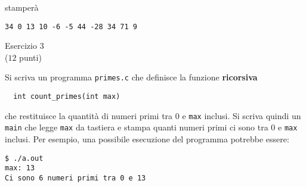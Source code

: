 \documentclass[italian,12pt]{article}
\begin{document}
\noindent
stamper\`a
%
{\small
\begin{verbatim}
34 0 13 10 -6 -5 44 -28 34 71 9
\end{verbatim}
}
%
\begin{center}{\Large Esercizio 3}\\
($12$ punti)\end{center}
%
Si scriva un programma \texttt{primes.c} che definisce la funzione \textbf{ricorsiva}
\begin{verbatim}
  int count_primes(int max)
\end{verbatim}
%
che restituisce la quantit\`a di numeri primi tra 0 e \texttt{max} inclusi.
Si scriva quindi un \texttt{main} che legge \texttt{max} da tastiera
e stampa quanti numeri primi ci sono tra 0 e \texttt{max} inclusi.
Per esempio, una possibile esecuzione del programma potrebbe essere:
%
{\small
\begin{verbatim}
$ ./a.out
max: 13
Ci sono 6 numeri primi tra 0 e 13
\end{verbatim}
}
\end{document}

